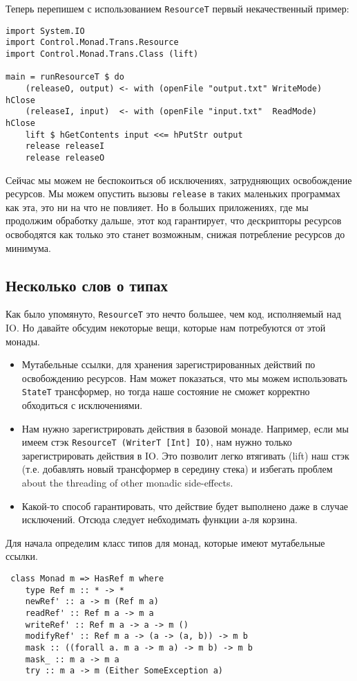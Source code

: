 Теперь перепишем с использованием \lstinline'ResourceT' первый некачественный пример:
\begin{lstlisting}
import System.IO
import Control.Monad.Trans.Resource
import Control.Monad.Trans.Class (lift)

main = runResourceT $ do
    (releaseO, output) <- with (openFile "output.txt" WriteMode) hClose
    (releaseI, input)  <- with (openFile "input.txt"  ReadMode)  hClose
    lift $ hGetContents input <<= hPutStr output
    release releaseI
    release releaseO
\end{lstlisting}

Сейчас мы можем не беспокоиться об исключениях, затрудняющих освобождение ресурсов. Мы
можем опустить вызовы \verb=release= в таких маленьких программах как эта, это ни на что
не повлияет. Но в больших приложениях, где мы продолжим обработку дальше, этот код
гарантирует, что дескрипторы ресурсов освободятся как только это станет возможным, снижая
потребление ресурсов до минимума.

\subsection{Несколько слов о типах}

Как было упомянуто, \lstinline'ResourceT' это нечто большее, чем код, исполняемый над IO.
Но давайте обсудим некоторые вещи, которые нам потребуются от этой монады.
\begin{itemize}
\item Мутабельные ссылки, для хранения зарегистрированных действий по освобождению
ресурсов. Нам может показаться, что мы можем использовать \lstinline'StateT' трансформер,
но тогда наше состояние не сможет корректно обходиться с исключениями.
\item Нам нужно зарегистрировать действия в базовой монаде. Например, если мы имеем 
стэк \lstinline'ResourceT (WriterT [Int] IO)', нам нужно только зарегистрировать
действия в IO. Это позволит легко втягивать (lift) наш стэк (т.е. добавлять новый
трансформер в середину стека) и избегать проблем about the
threading of other monadic side-effects.
\item Какой-то способ гарантировать, что действие будет выполнено даже в случае
исключений. Отсюда следует небходимать функции а-ля корзина.
\end{itemize}

Для начала определим класс типов для монад, которые имеют мутабельные ссылки.
\begin{lstlisting}
 class Monad m => HasRef m where
    type Ref m :: * -> *
    newRef' :: a -> m (Ref m a)
    readRef' :: Ref m a -> m a
    writeRef' :: Ref m a -> a -> m ()
    modifyRef' :: Ref m a -> (a -> (a, b)) -> m b
    mask :: ((forall a. m a -> m a) -> m b) -> m b
    mask_ :: m a -> m a
    try :: m a -> m (Either SomeException a)
\end{lstlisting}

